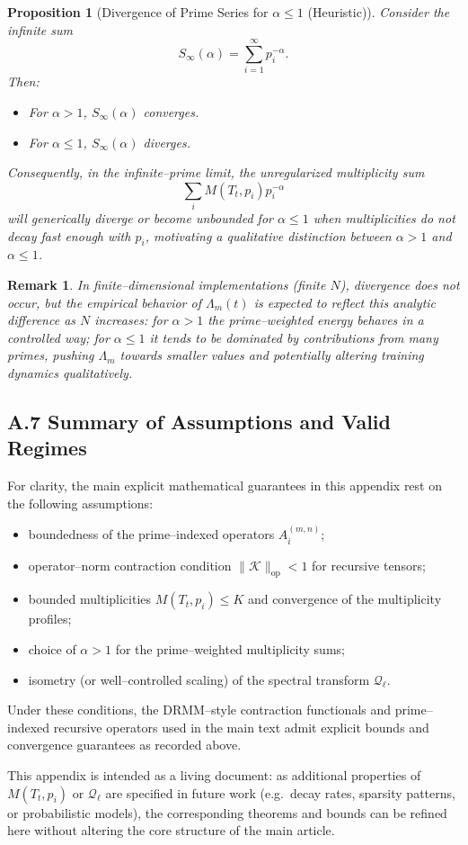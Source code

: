 \documentclass[11pt]{article}
\newtheorem{proposition}{Proposition}
\newtheorem{remark}{Remark}
\begin{document}
\begin{proposition}[Divergence of Prime Series for $\alpha\le 1$ (Heuristic)]
Consider the infinite sum
\[
  S_\infty(\alpha) = \sum_{i=1}^{\infty} p_i^{-\alpha}.
\]
Then:
\begin{itemize}[leftmargin=*]
  \item For $\alpha>1$, $S_\infty(\alpha)$ converges.
  \item For $\alpha\le 1$, $S_\infty(\alpha)$ diverges.
\end{itemize}
Consequently, in the infinite–prime limit, the unregularized multiplicity sum
\[
  \sum_{i} M(T_t,p_i)p_i^{-\alpha}
\]
will generically diverge or become unbounded for $\alpha\le 1$ when multiplicities do not decay fast enough with $p_i$, motivating a qualitative distinction between $\alpha>1$ and $\alpha\le 1$.
\end{proposition}

\begin{remark}
In finite–dimensional implementations (finite $N$), divergence does not occur, but the empirical behavior of $\Lambda_m(t)$ is expected to reflect this analytic difference as $N$ increases: for $\alpha>1$ the prime–weighted energy behaves in a controlled way; for $\alpha\le 1$ it tends to be dominated by contributions from many primes, pushing $\Lambda_m$ towards smaller values and potentially altering training dynamics qualitatively.
\end{remark}

\subsection*{A.7 Summary of Assumptions and Valid Regimes}

For clarity, the main explicit mathematical guarantees in this appendix rest on the following assumptions:
\begin{itemize}[leftmargin=*]
  \item boundedness of the prime–indexed operators $A^{(m,n)}_i$;
  \item operator–norm contraction condition $\|\mathcal{K}\|_{\mathrm{op}}<1$ for recursive tensors;
  \item bounded multiplicities $M(T_t,p_i)\le K$ and convergence of the multiplicity profiles;
  \item choice of $\alpha>1$ for the prime–weighted multiplicity sums;
  \item isometry (or well–controlled scaling) of the spectral transform $\mathcal{Q}_\ell$.
\end{itemize}
Under these conditions, the DRMM–style contraction functionals and prime–indexed recursive operators used in the main text admit explicit bounds and convergence guarantees as recorded above.

This appendix is intended as a living document: as additional properties of $M(T_t,p_i)$ or $\mathcal{Q}_\ell$ are specified in future work (e.g.\ decay rates, sparsity patterns, or probabilistic models), the corresponding theorems and bounds can be refined here without altering the core structure of the main article.

\nocite{*}
  

\end{document}
